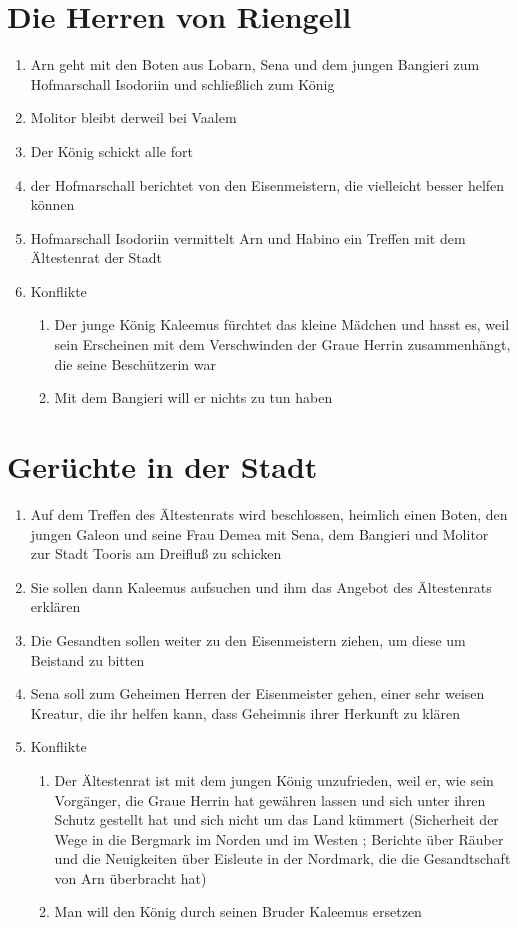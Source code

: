 \documentclass[12pt,a4paper,onecolumn,twoside,ngerman]{book}
\newcommand{\Molitor}{Molitor}
\newcommand{\Sena}{Sena}
\newcommand{\Bangiri}{Bangieri}
\newcommand{\Lobarn}{Lobarn}
\newcommand{\Nordmark}{Nordmark}
\newcommand{\Bergmark}{Bergmark}
\newcommand{\Arn}{Arn}
\newcommand{\Eisleute}{Eisleute}
\newcommand{\Rhingell}{Riengell}
\newcommand{\Habino}{Habino}
\newcommand{\Valem}{Vaalem}
\newcommand{\Kalemus}{Kaleemus}
\newcommand{\Isodoriin}{Isodoriin}
\newcommand{\Galeon}{Galeon}
\newcommand{\Demea}{Demea}
\newcommand{\Dreifluss}{Dreifluß}
\newcommand{\Toris}{Tooris}
\newcommand{\Eisenmeister}{Eisenmeister}
\begin{document}
\section{Die Herren von \Rhingell}
\begin{enumerate}
  \item {\Arn} geht mit den Boten aus {\Lobarn}, {\Sena} und dem jungen {\Bangiri} zum Hofmarschall {\Isodoriin} und schließlich zum König
  \item {\Molitor} bleibt derweil bei {\Valem}
  \item Der König schickt alle fort
  \item der Hofmarschall berichtet von den {\Eisenmeister}n, die vielleicht besser helfen können
  \item Hofmarschall {\Isodoriin} vermittelt {\Arn} und {\Habino} ein Treffen mit dem Ältestenrat der Stadt
  \item Konflikte
  \begin{enumerate}
    \item Der junge König {\Kalemus} fürchtet das kleine Mädchen und hasst es, weil sein Erscheinen mit dem Verschwinden der Graue Herrin zusammenhängt, die seine Beschützerin war
    \item Mit dem {\Bangiri} will er nichts zu tun haben
  \end{enumerate}
\end{enumerate}

\section{Gerüchte in der Stadt}
\begin{enumerate}
  \item Auf dem Treffen des Ältestenrats wird beschlossen, heimlich einen Boten, den jungen {\Galeon} und seine Frau {\Demea} mit {\Sena}, dem {\Bangiri} und {\Molitor} zur Stadt {\Toris} am {\Dreifluss} zu schicken
  \item Sie sollen dann {\Kalemus} aufsuchen und ihm das Angebot des Ältestenrats erklären
  \item Die Gesandten sollen weiter zu den {\Eisenmeister}{n} ziehen, um diese um Beistand zu bitten
  \item {\Sena} soll zum Geheimen Herren der {\Eisenmeister} gehen, einer sehr weisen Kreatur, die ihr helfen kann, dass Geheimnis ihrer Herkunft zu klären
  \item Konflikte
  \begin{enumerate}
    \item Der Ältestenrat ist mit dem jungen König unzufrieden, weil er, wie sein Vorgänger, die Graue Herrin hat gewähren lassen und sich unter ihren Schutz gestellt hat und sich nicht um das Land kümmert (Sicherheit der Wege in die {\Bergmark} im Norden und im Westen ; Berichte über Räuber und die Neuigkeiten über {\Eisleute} in der {\Nordmark}, die die Gesandtschaft von {\Arn} überbracht hat)
    \item Man will den König durch seinen Bruder {\Kalemus} ersetzen 
  \end{enumerate}
\end{enumerate}
\end{document}
